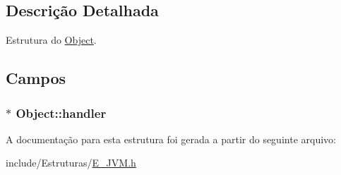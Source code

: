 \subsection{Descrição Detalhada}
Estrutura do \hyperlink{struct_object}{Object}. 

\subsection{Campos}
\hypertarget{struct_object_aad3f75cdc4a1d18ef18974c6106d64ad}{}
\subsubsection[{handler}]{$\ast$ Object\+::handler}\label{struct_object_aad3f75cdc4a1d18ef18974c6106d64ad}


A documentação para esta estrutura foi gerada a partir do seguinte arquivo\+:\begin{DoxyCompactItemize}
\item 
include/\+Estruturas/\hyperlink{_e___j_v_m_8h}{E\+\_\+\+J\+V\+M.\+h}\end{DoxyCompactItemize}
